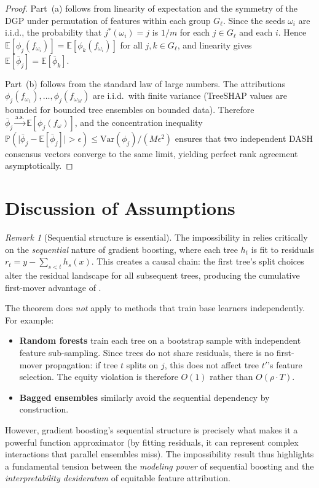 \documentclass[11pt]{article}
\theoremstyle{remark}
\newtheorem{remark}[theorem]{Remark}
\newcommand{\Gl}{G_\ell}                    %
\newcommand{\phij}{\phi_j}                  %
\newcommand{\phik}{\phi_k}                  %
\newcommand{\totalT}{T}                     %
\newcommand{\rhovar}{\rho}                  %
\newcommand{\Exp}{\mathbb{E}}              %
\newcommand{\Prob}{\mathbb{P}}             %
\newcommand{\Var}{\mathrm{Var}}            %
\newcommand{\abs}[1]{\lvert #1 \rvert}
\newcommand{\dash}{\textsc{DASH}}
\begin{document}
\begin{proof}
Part~(a) follows from linearity of expectation and the symmetry of the
DGP under permutation of features within each group $\Gl$.  Since the
seeds $\omega_i$ are i.i.d., the probability that $j^*(\omega_i) = j$
is $1/m$ for each $j \in \Gl$ and each $i$.  Hence
$\Exp[\phij(f_{\omega_i})] = \Exp[\phik(f_{\omega_i})]$ for all
$j, k \in \Gl$, and linearity gives
$\Exp[\bar{\phi}_j] = \Exp[\bar{\phi}_k]$.

Part~(b) follows from the standard law of large numbers.
The attributions $\phij(f_{\omega_1}), \dots, \phij(f_{\omega_M})$ are
i.i.d.\ with finite variance (TreeSHAP values are bounded for bounded
tree ensembles on bounded data).  Therefore
$\bar{\phi}_j \xrightarrow{\mathrm{a.s.}} \Exp[\phij(f_\omega)]$, and
the concentration inequality
$\Prob(\abs{\bar{\phi}_j - \Exp[\bar{\phi}_j]} > \epsilon)
  \leq \Var(\phij) / (M \epsilon^2)$
ensures that two independent \dash{} consensus vectors converge to the
same limit, yielding perfect rank agreement asymptotically.
\end{proof}


\section{Discussion of Assumptions}
\label{sec:assumptions}

\begin{remark}[Sequential structure is essential]
\label{rem:sequential}
The impossibility in  relies critically on the
\emph{sequential} nature of gradient boosting, where each tree $h_t$ is
fit to residuals $r_t = y - \sum_{s<t} h_s(x)$.  This creates a causal
chain: the first tree's split choices alter the residual landscape for all
subsequent trees, producing the cumulative first-mover advantage of
.

The theorem does \emph{not} apply to methods that train base learners
independently.  For example:
\begin{itemize}
  \item \textbf{Random forests} train each tree on a bootstrap sample with
    independent feature sub-sampling.  Since trees do not share residuals,
    there is no first-mover propagation: if tree $t$ splits on $j$, this
    does not affect tree $t'$'s feature selection.  The equity violation is
    therefore $O(1)$ rather than $O(\rhovar \cdot \totalT)$.
  \item \textbf{Bagged ensembles} similarly avoid the sequential dependency
    by construction.
\end{itemize}
However, gradient boosting's sequential structure is precisely what makes
it a powerful function approximator (by fitting residuals, it can represent
complex interactions that parallel ensembles miss).  The impossibility
result thus highlights a fundamental tension between the \emph{modeling
power} of sequential boosting and the \emph{interpretability desideratum}
of equitable feature attribution.
\end{remark}
\end{document}

